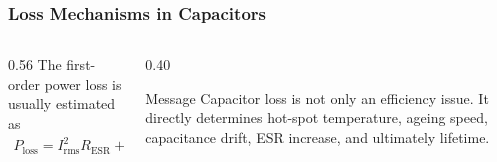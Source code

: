 \begin{frame}
\frametitle{Loss Mechanisms in Capacitors}

\begin{columns}
\begin{column}{0.56\textwidth}
The first-order power loss is usually estimated as
\begin{align}
    P_{\mathrm{loss}}
    =
    I_{\mathrm{rms}}^2R_{\mathrm{ESR}}
    +
    P_{\mathrm{dielectric}}
    +
    P_{\mathrm{leak}}
\end{align}
\end{column}

\begin{column}{0.40\textwidth}
\begin{block}{Message}
\small
Capacitor loss is not only an efficiency issue. It directly determines hot-spot temperature, ageing speed, capacitance drift, ESR increase, and ultimately lifetime.
\end{block}
\end{column}
\end{columns}

\end{frame}

